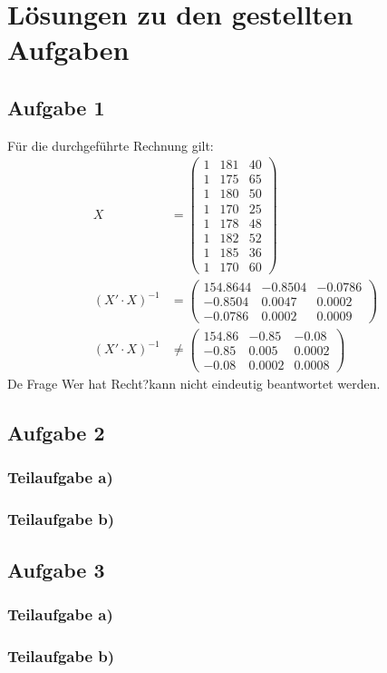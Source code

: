 \documentclass{llncs}
\begin{document}
\chapter*{L\"osungen zu den gestellten Aufgaben}

\section*{Aufgabe 1}

F\"ur die durchgef\"uhrte Rechnung gilt:
\begin{align*}
                X &= \left( \begin{matrix} 1 & 181 & 40\\1 & 175 & 65\\1 & 180 & 50\\1 & 170 & 25\\1 & 178 & 48 \\ 1 & 182 & 52\\1 & 185 & 36\\ 1 & 170 & 60\end{matrix} \right) \\
(X' \cdot X)^{-1} &= \left( \begin{matrix} 154.8644 & -0.8504 & -0.0786 \\ -0.8504 & 0.0047 & 0.0002 \\ -0.0786 & 0.0002 & 0.0009 \end{matrix} \right) \\
(X' \cdot X)^{-1} &\neq \left( \begin{matrix}154.86 & -0.85 & -0.08\\-0.85 & 0.005 & 0.0002\\-0.08 & 0.0002 & 0.0008\end{matrix} \right)
\end{align*}
De Frage \glqq Wer hat Recht?\grqq kann nicht eindeutig beantwortet werden.

\section*{Aufgabe 2}

\subsection*{Teilaufgabe a)}

\subsection*{Teilaufgabe b)}

\section*{Aufgabe 3}

\subsection*{Teilaufgabe a)}

\subsection*{Teilaufgabe b)}
\end{document}
